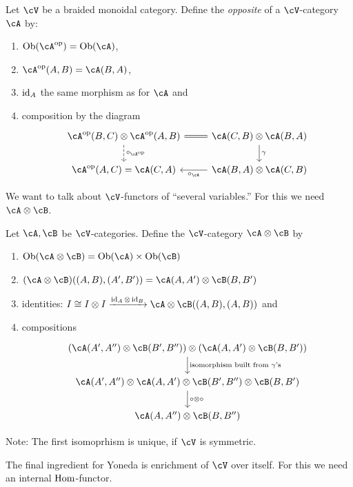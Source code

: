 \documentclass[a4paper,11pt,oneside,openany]{scrbook}
\begin{document}
\begin{defn}
    Let $ \cV $ be a braided monoidal category.
    Define the \emph{opposite} of a $ \cV $-category~$ \cA $ by:
    \begin{enumerate}[label=$\bullet$]
	\item $ \Ob(\cA^{\op}) = \Ob(\cA) $,
	\item $ \cA^{\op}(A,B) = \cA(B,A) $,
	\item $ \operatorname{id}_A $ the same morphism as for $ \cA $ and
	\item composition by the diagram
	    \begin{displaymath}
	        \begin{tikzcd}
		    \cA^{\op}(B,C)\otimes \cA^{\op}(A,B)\arrow[r, equal] \arrow[d, dashed, "\circ_{\cA^{\op}}"]& \cA(C,B)\otimes \cA(B,A) \arrow[d, "\gamma"] \\
		    \cA^{\op}(A,C) = \cA(C,A) & \cA(B,A)\otimes \cA(C,B) \arrow[l, "\circ_\cA"]
	        \end{tikzcd}
	    \end{displaymath}
    \end{enumerate}
\end{defn}
We want to talk about $ \cV $-functors of ``several variables.''
For this we need $ \cA \otimes \cB$.
\begin{defn}
    Let $ \cA,\cB $ be $ \cV $-categories.
    Define the $ \cV $-category $ \cA \otimes \cB $ by
    \begin{enumerate}[label=$ \bullet $]
	\item $ \Ob(\cA\otimes \cB) = \Ob(\cA) \times \Ob(\cB) $
	\item $ (\cA\otimes\cB)((A,B),(A',B')) = \cA(A,A')\otimes \cB(B,B') $
	\item identities: $ I \iso I\otimes I \xrightarrow{\id_A \otimes \id_B} \cA\otimes\cB((A,B),(A,B)) $ and
	\item compositions
	    \begin{displaymath}
	        \begin{tikzcd}
		    (\cA(A',A'') \otimes \cB(B',B'')) \otimes (\cA(A,A') \otimes \cB(B,B'))
		    \arrow[d, "\text{isomorphism built from $ \gamma $'s}"]
		    \\
		    \cA(A',A'') \otimes \cA(A,A')\otimes \cB(B',B'')\otimes \cB(B,B')
		    \arrow[d, "\circ\otimes\circ"]\\
		    \cA(A,A'')\otimes \cB(B,B'')
	        \end{tikzcd}
	    \end{displaymath}
    \end{enumerate}
    Note: The first isomoprhism is unique, if $ \cV $ is symmetric.
\end{defn}
The final ingredient for Yoneda is enrichment of $ \cV $ over itself.
For this we need an internal $ \operatorname{\text{Hom}} $-functor.
\end{document}
